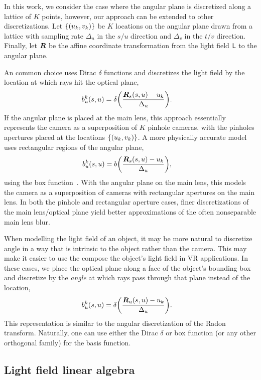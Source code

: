 In this work, we consider the case where the angular plane is discretized along
a lattice of $K$ points, however, our approach can be extended to other
discretizations. Let $ {\left\{  {\left( u_k, v_k \right)} \right\} }$ be $K$ locations on the angular plane
drawn from a lattice with sampling rate $\Delta_u$ in the $s/u$ direction and
$\Delta_v$ in the $t/v$ direction.  Finally, let ${\bm{R}}$ be the affine coordinate
transformation from the light field $\mathsf{L}$ to the angular plane.  

An common choice uses Dirac $\delta$ functions and discretizes the light field
by the location at which rays hit the optical plane, \eg
\begin{align}
    b^k_u {\left( s, u \right)}
    &=
    \delta {\left( \frac{{\ensuremath{\bm{R}}}_s\ensuremath{ {\left( s,u \right)}} - u_k}{\Delta_u} \right)}.
\end{align}
If the angular plane is placed at the main lens, this approach essentially
represents the camera as a superposition of $K$ pinhole cameras, with the
pinholes apertures placed at the locations $ {\left\{  {\left( u_k, v_k \right)} \right\} }$.  A more
physically accurate model uses rectangular regions of the angular plane, \eg
\begin{align}
    b^k_u {\left( s, u \right)}
    &=
    b {\left( \frac{{\bm{R}}_s {\left( s,u \right)} - u_k}{\Delta_u} \right)},
\end{align}
using the box function~.  With the angular plane on the main
lens, this models the camera as a superposition of cameras with rectangular
apertures on the main lens.  In both the pinhole and rectangular aperture
cases, finer discretizations of the main lens/optical plane yield better
approximations of the often nonseparable main lens blur.

When modelling the light field of an object, it may be more natural to discretize
angle in a way that is intrinsic to the object rather than the camera.  This
may make it easier to use the compose the object's light field in \eg VR 
applications.  In these cases, we place the optical plane along a face of the
object's bounding box and discretize by the {\it angle} at which rays pass
through that plane instead of the location, \eg
\begin{align}
    b^k_u {\left( s,u \right)}
    &=
    \delta {\left( \frac{{\ensuremath{\bm{R}}}_u\ensuremath{ {\left( s,u \right)}} - u_k}{\Delta_u} \right)}.
\end{align}
This representation is similar to the angular discretization of the Radon
transform.  Naturally, one can use either the Dirac $\delta$ or box function
(or any other orthogonal family) for the basis function.

\subsection{Light field linear algebra}

